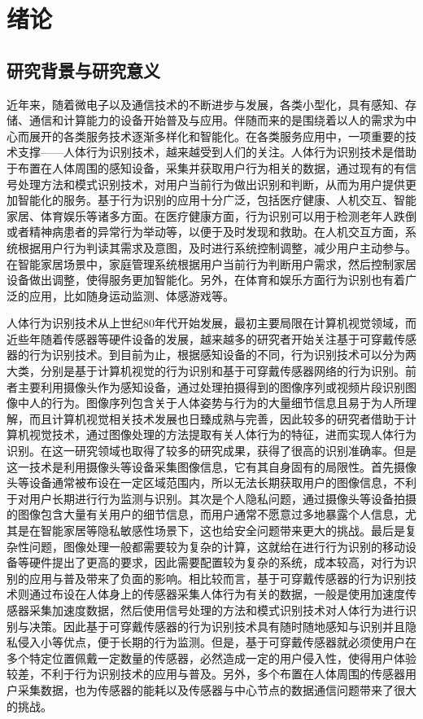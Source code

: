 
\chapter{绪论}
\section{研究背景与研究意义}
\par 近年来，随着微电子以及通信技术的不断进步与发展，各类小型化，具有感知、存储、通信和计算能力的设备开始普及与应用。伴随而来的是围绕着以人的需求为中心而展开的各类服务技术逐渐多样化和智能化。在各类服务应用中，一项重要的技术支撑——人体行为识别技术，越来越受到人们的关注。人体行为识别技术是借助于布置在人体周围的感知设备，采集并获取用户行为相关的数据，通过现有的有信号处理方法和模式识别技术，对用户当前行为做出识别和判断，从而为用户提供更加智能化的服务。基于行为识别的应用十分广泛，包括医疗健康、人机交互、智能家居、体育娱乐等诸多方面\cite{lockhart2012applications}。在医疗健康方面，行为识别可以用于检测老年人跌倒或者精神病患者的异常行为举动等，以便于及时发现和救助\cite{avci2010activity}。在人机交互方面，系统根据用户行为判读其需求及意图，及时进行系统控制调整，减少用户主动参与。在智能家居场景中，家庭管理系统根据用户当前行为判断用户需求，然后控制家居设备做出调整，使得服务更加智能化。另外，在体育和娱乐方面行为识别也有着广泛的应用，比如随身运动监测、体感游戏等。

\par 人体行为识别技术从上世纪80年代开始发展\cite{surveyOnSensors}，最初主要局限在计算机视觉领域，而近些年随着传感器等硬件设备的发展，越来越多的研究者开始关注基于可穿戴传感器的行为识别技术。到目前为止，根据感知设备的不同，行为识别技术可以分为两大类，分别是基于计算机视觉的行为识别和基于可穿戴传感器网络的行为识别。前者主要利用摄像头作为感知设备，通过处理拍摄得到的图像序列或视频片段识别图像中人的行为\cite{surveyOnVision}。图像序列包含关于人体姿势与行为的大量细节信息且易于为人所理解，而且计算机视觉相关技术发展也日臻成熟与完善，因此较多的研究者借助于计算机视觉技术，通过图像处理的方法提取有关人体行为的特征，进而实现人体行为识别。在这一研究领域也取得了较多的研究成果，获得了很高的识别准确率。但是这一技术是利用摄像头等设备采集图像信息，它有其自身固有的局限性。首先摄像头等设备通常被布设在一定区域范围内，所以无法长期获取用户的图像信息，不利于对用户长期进行行为监测与识别。其次是个人隐私问题，通过摄像头等设备拍摄的图像包含大量有关用户的细节信息，而用户通常不愿意过多地暴露个人信息，尤其是在智能家居等隐私敏感性场景下，这也给安全问题带来更大的挑战。最后是复杂性问题，图像处理一般都需要较为复杂的计算，这就给在进行行为识别的移动设备等硬件提出了更高的要求，因此需要配置较为复杂的系统，成本较高，对行为识别的应用与普及带来了负面的影响。相比较而言，基于可穿戴传感器的行为识别技术\cite{sensorBased}则通过布设在人体身上的传感器采集人体行为有关的数据，一般是使用加速度传感器采集加速度数据，然后使用信号处理的方法和模式识别技术对人体行为进行识别与决策。因此基于可穿戴传感器的行为识别技术具有随时随地感知与识别并且隐私侵入小等优点，便于长期的行为监测。但是，基于可穿戴传感器就必须使用户在多个特定位置佩戴一定数量的传感器\cite{kozina2013efficient}，必然造成一定的用户侵入性，使得用户体验较差，不利于行为识别技术的应用与普及。另外，多个布置在人体周围的传感器用户采集数据，也为传感器的能耗以及传感器与中心节点的数据通信问题带来了很大的挑战。

